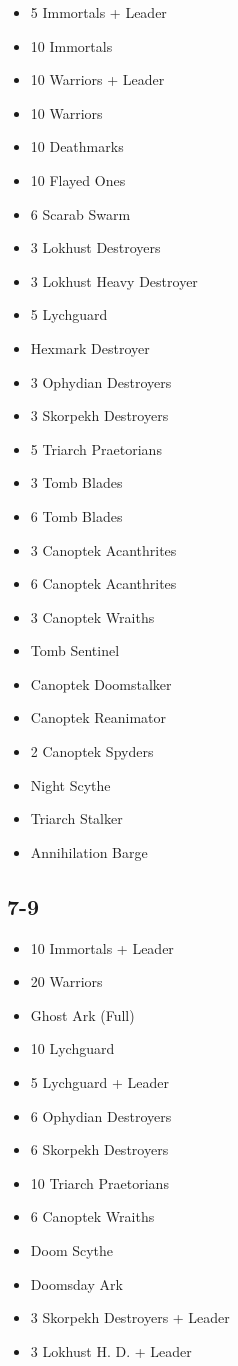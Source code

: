\documentclass{HordeModeTarot}
\begin{document}
\begin{multicols}{2}
\begin{itemize}[leftmargin=*]
\item[] 5 Immortals + Leader
\item[] 10 Immortals
\item[] 10 Warriors + Leader
\item[] 10 Warriors
\item[] 10 Deathmarks
\item[] 10 Flayed Ones
\item[] 6 Scarab Swarm
\item[] 3 Lokhust Destroyers
\item[] 3 Lokhust Heavy Destroyer
\item[] 5 Lychguard
\item[] Hexmark Destroyer
\item[] 3 Ophydian Destroyers
\item[] 3 Skorpekh Destroyers
\item[] 5 Triarch Praetorians
\item[] 3 Tomb Blades
\item[] 6 Tomb Blades
\item[] 3 Canoptek Acanthrites
\item[] 6 Canoptek Acanthrites
\item[] 3 Canoptek Wraiths
\item[] Tomb Sentinel
\item[] Canoptek Doomstalker
\item[] Canoptek Reanimator
\item[] 2 Canoptek Spyders
\item[] Night Scythe
\item[] Triarch Stalker
\item[] Annihilation Barge
\end{itemize}

\subsection*{7-9}

\begin{itemize}[leftmargin=*]
\item[] 10 Immortals + Leader
\item[] 20 Warriors
\item[] Ghost Ark (Full)
\item[] 10 Lychguard
\item[] 5 Lychguard + Leader
\item[] 6 Ophydian Destroyers
\item[] 6 Skorpekh Destroyers
\item[] 10 Triarch Praetorians
\item[] 6 Canoptek Wraiths
\item[] Doom Scythe
\item[] Doomsday Ark
\item[] 3 Skorpekh Destroyers + Leader
\item[] 3 Lokhust H. D. + Leader
\end{itemize}


\end{multicols}
\end{document}
